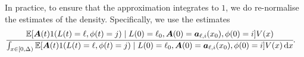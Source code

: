 In practice, to ensure that the approximation integrates to \(1\), we do re-normalise the estimates of the density. Specifically, we use the estimates
\begin{align}
	&\cfrac{\mathbb E[\boldsymbol A(t) 1(L(t)=\ell,\phi(t)=j) \mid L(0)=\ell_0, \boldsymbol A(0) = \boldsymbol  a_{\ell,i}(x_0), \phi(0) = i]V(x)}{\int_{x\in[0,\Delta)}\mathbb E[\boldsymbol A(t) 1(L(t)=\ell,\phi(t)=j) \mid L(0)=\ell_0, \boldsymbol A(0) = \boldsymbol  a_{\ell,i}(x_0), \phi(0) = i]V(x)\, \mathrm{d} x}.
\end{align}





















